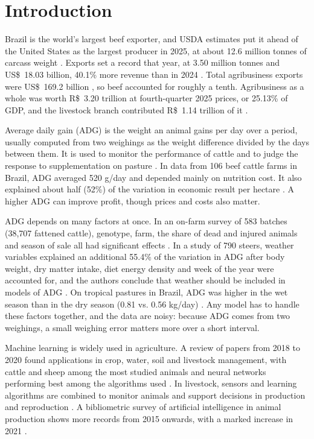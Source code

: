\documentclass[runningheads]{llncs}
\begin{document}
\section{Introduction}

Brazil is the world's largest beef exporter, and USDA estimates put it ahead of the United States as the largest producer in 2025, at about 12.6 million tonnes of carcass weight \cite{usda2025}. Exports set a record that year, at 3.50 million tonnes and US\$~18.03 billion, 40.1\% more revenue than in 2024 \cite{abiec2026}. Total agribusiness exports were US\$~169.2 billion \cite{insper2026exportacoes}, so beef accounted for roughly a tenth. Agribusiness as a whole was worth R\$~3.20 trillion at fourth-quarter 2025 prices, or 25.13\% of GDP, and the livestock branch contributed R\$~1.14 trillion of it \cite{cepea2026}.

Average daily gain (ADG) is the weight an animal gains per day over a period, usually computed from two weighings as the weight difference divided by the days between them. It is used to monitor the performance of cattle \cite{carvalho2017} and to judge the response to supplementation on pasture \cite{tambara2021}. In data from 106 beef cattle farms in Brazil, ADG averaged 520 g/day and depended mainly on nutrition cost. It also explained about half (52\%) of the variation in economic result per hectare \cite{semchechem2021}. A higher ADG can improve profit, though prices and costs also matter.

ADG depends on many factors at once. In an on-farm survey of 583 batches (38,707 fattened cattle), genotype, farm, the share of dead and injured animals and season of sale all had significant effects \cite{veneto}. In a study of 790 steers, weather variables explained an additional 55.4\% of the variation in ADG after body weight, dry matter intake, diet energy density and week of the year were accounted for, and the authors conclude that weather should be included in models of ADG \cite{ndsuweather}. On tropical pastures in Brazil, ADG was higher in the wet season than in the dry season (0.81 vs. 0.56 kg/day) \cite{tambara2021}. Any model has to handle these factors together, and the data are noisy: because ADG comes from two weighings, a small weighing error matters more over a short interval.

Machine learning is widely used in agriculture. A review of papers from 2018 to 2020 found applications in crop, water, soil and livestock management, with cattle and sheep among the most studied animals and neural networks performing best among the algorithms used \cite{benos2021}. In livestock, sensors and learning algorithms are combined to monitor animals and support decisions in production and reproduction \cite{curti2023}. A bibliometric survey of artificial intelligence in animal production shows more records from 2015 onwards, with a marked increase in 2021 \cite{castro2025}.
\end{document}
